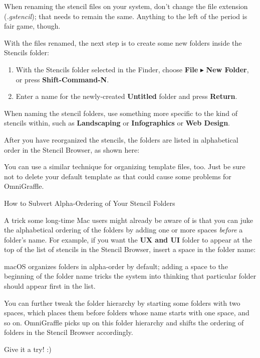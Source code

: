 \documentclass[../main.tex]{subfiles}
\begin{document}

\begin{ogwarning}
  When renaming the stencil files on your system, don't change the file extension
  (\textit{.gstencil}); that needs to remain the same. Anything to the left of the period is
  fair game, though.
\end{ogwarning}

With the files renamed, the next step is to create some new folders inside the Stencils folder:

\begin{enumerate}
  \item With the Stencils folder selected in the Finder, choose \textbf{File}
    $\blacktriangleright$ \textbf{New Folder}, or press \textbf{Shift-Command-N}.
  \item Enter a name for the newly-created \textbf{Untitled} folder and press \textbf{Return}.
\end{enumerate}

When naming the stencil folders, use something more specific to the kind of stencils within,
such as \textbf{Landscaping} or \textbf{Infographics} or \textbf{Web Design}.

After you have reorganized the stencils, the folders are listed in alphabetical order in the
Stencil Browser, as shown here:


You can use a similar technique for organizing template files, too. Just be sure not to delete
your default template as that could cause some problems for OmniGraffle.

\begin{ogsidebar}
  How to Subvert Alpha-Ordering of Your Stencil Folders

  A trick some long-time Mac users might already be aware of is that you can juke the
  alphabetical ordering of the folders by adding one or more spaces \textit{before} a folder's
  name. For example, if you want the \textbf{UX and UI} folder to appear at the top of the
  list of stencils in the Stencil Browser, insert a space in the folder name:


  macOS organizes folders in alpha-order by default; adding a space to the beginning of the
  folder name tricks the system into thinking that particular folder should appear first in
  the list.

  You can further tweak the folder hierarchy by starting some folders with two spaces, which
  places them before folders whose name starts with one space, and so on. OmniGraffle picks up
  on this folder hierarchy and shifts the ordering of folders in the Stencil Browser
  accordingly.

Give it a try! :)
\end{ogsidebar}
\end{document}
